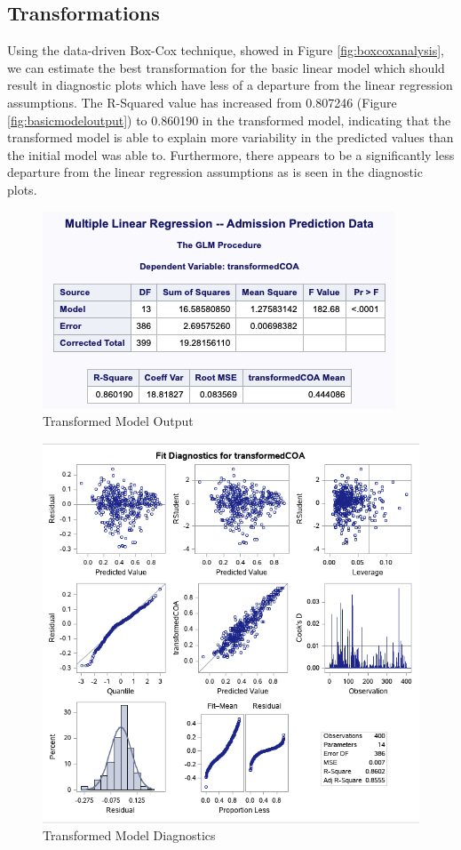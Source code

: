 \documentclass{article}
\begin{document}
\subsection*{Transformations}
Using the data-driven Box-Cox technique, showed in Figure \ref{fig:boxcoxanalysis}, we can estimate the best transformation for the basic linear model which should result in diagnostic plots which have less of a departure from the linear regression assumptions. The R-Squared value has increased from 0.807246 (Figure \ref{fig:basicmodeloutput}) to 0.860190 in the transformed model, indicating that the transformed model is able to explain more variability in the predicted values than the initial model was able to. Furthermore, there appears to be a significantly less departure from the linear regression assumptions as is seen in the diagnostic plots.

\begin{figure}
\centering
\includegraphics[scale=0.6]{transformed_model_output.png}
\caption{Transformed Model Output}
\label{fig:transformedmodeloutput}
\end{figure}


\begin{figure}
\centering
\includegraphics[scale=0.6]{transformed_model_diagnostics.png}
\caption{Transformed Model Diagnostics}
\label{fig:transformedmodeldiagnostics}
\end{figure}
\end{document}
